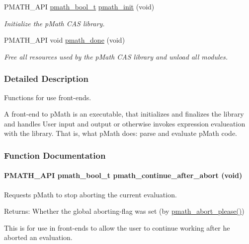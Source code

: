 \begin{CompactItemize}
PMATH\_\-API \hyperlink{group__general__types_gc92090cb0b56345d6c379ed2341d4ef4}{pmath\_\-bool\_\-t} \hyperlink{group__frontend_gfb9f2c789bee5295c6794d16c0164943}{pmath\_\-init} (void)
\begin{CompactList}\small\item\em Initialize the pMath CAS library. \item\end{CompactList}\item 
PMATH\_\-API void \hyperlink{group__frontend_g012705e1fd248a7cebf738bae6375dd9}{pmath\_\-done} (void)
\begin{CompactList}\small\item\em Free all resources used by the pMath CAS library and unload all modules. \item\end{CompactList}\end{CompactItemize}


\subsubsection{Detailed Description}
Functions for use front-ends. 

A front-end to pMath is an executable, that initializes and finalizes the library and handles User input and output or otherwise invokes expression evalueation with the library. That is, what pMath does: parse and evaluate pMath code. 

\subsubsection{Function Documentation}
\hypertarget{group__frontend_g4934c2dc54f852627f8b291543a21e43}{
\paragraph[{pmath\_\-continue\_\-after\_\-abort}]{\setlength{\rightskip}{0pt plus 5cm}PMATH\_\-API {\bf pmath\_\-bool\_\-t} pmath\_\-continue\_\-after\_\-abort (void)}\hfill}
\label{group__frontend_g4934c2dc54f852627f8b291543a21e43}


Requests pMath to stop aborting the current evaluation. 

\begin{Desc}
\item[Returns:]Whether the global aborting-flag was set (by \hyperlink{group__threads_g84e45036b76764def6390af12d2070bf}{pmath\_\-abort\_\-please()})\end{Desc}
This is for use in front-ends to allow the user to continue working after he aborted an evaluation.

